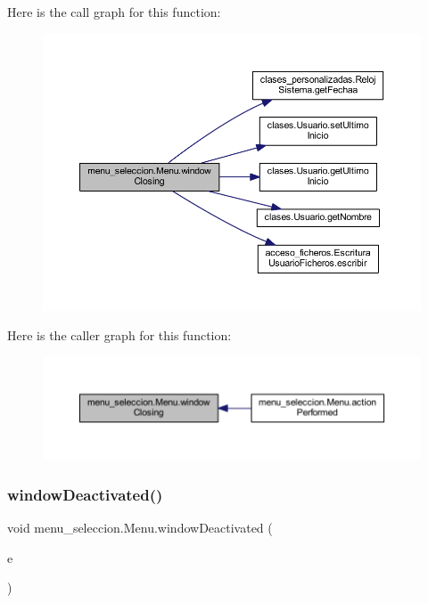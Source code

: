 Here is the call graph for this function\+:
\nopagebreak
\begin{figure}[H]
\begin{center}
\leavevmode
\includegraphics[width=350pt]{classmenu__seleccion_1_1_menu_aa0e102a13ab297de1bf364adaae917cb_cgraph}
\end{center}
\end{figure}
Here is the caller graph for this function\+:
\nopagebreak
\begin{figure}[H]
\begin{center}
\leavevmode
\includegraphics[width=350pt]{classmenu__seleccion_1_1_menu_aa0e102a13ab297de1bf364adaae917cb_icgraph}
\end{center}
\end{figure}
\mbox{\label{classmenu__seleccion_1_1_menu_acfd4d13c72c923e22bf9e00261e3862a}} 
\subsubsection{\texorpdfstring{window\+Deactivated()}{windowDeactivated()}}
{\footnotesize\ttfamily void menu\+\_\+seleccion.\+Menu.\+window\+Deactivated (\begin{DoxyParamCaption}\item[{Window\+Event}]{e }\end{DoxyParamCaption})}

